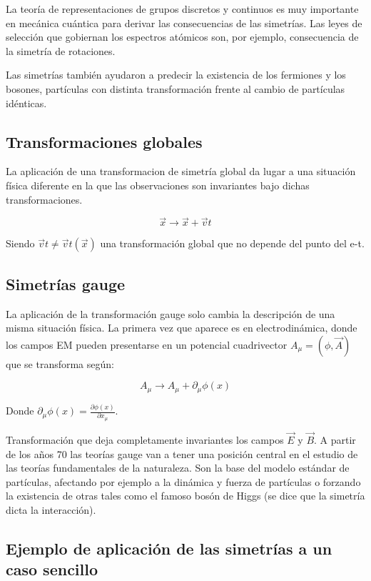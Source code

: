 \documentclass{article}
\begin{document}
La teoría de representaciones de grupos discretos y continuos es muy importante en mecánica cuántica para derivar las consecuencias de las simetrías. Las leyes de selección que gobiernan los espectros atómicos son, por ejemplo, consecuencia de la simetría de rotaciones.

Las simetrías también ayudaron a predecir la existencia de los fermiones y los bosones, partículas con distinta transformación frente al cambio de partículas idénticas.

\subsection{Transformaciones globales}
La aplicación de una transformacion de simetría global da lugar a una situación física diferente en la que las observaciones son invariantes bajo dichas transformaciones.

$$\Vec{x}\longrightarrow \Vec{x}+\Vec{v}t$$

Siendo $\Vec{v}t\neq \Vec{v}t(\Vec{x})$ una transformación global que no depende del punto del e-t.


\subsection{Simetrías gauge}
La aplicación de la transformación gauge solo cambia la descripción de una misma situación física. La primera vez que aparece es en electrodinámica, donde los campos EM pueden presentarse en un potencial cuadrivector $A_\mu=(\phi, \Vec{A})$ que se transforma según:

$$A_\mu \longrightarrow A_\mu +\partial _\mu \phi (x)$$

Donde $\partial _\mu \phi (x)=\frac{\partial \phi (x)}{\partial x_\mu}$.

Transformación que deja completamente invariantes los campos $\Vec{E}$ y $\Vec{B}$. A partir de los años 70 las teorías gauge van a tener una posición central en el estudio de las teorías fundamentales de la naturaleza. Son la base del modelo estándar de partículas, afectando por ejemplo a la dinámica y fuerza de partículas o forzando la existencia de otras tales como el famoso bosón de Higgs (se dice que la simetría dicta la interacción).

\newpage
\subsection{Ejemplo de aplicación de las simetrías a un caso sencillo}
\end{document}
